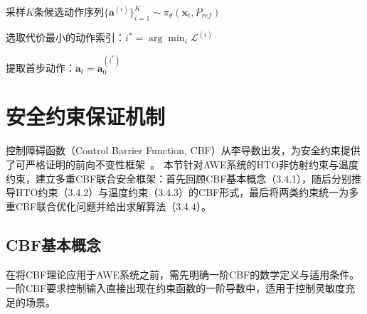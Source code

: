 \begin{algorithm}[htb]
  \caption{生成模型控制策略}
  \label{algo:generative_control}
  \SetAlgoLined

  采样$K$条候选动作序列$\{\mathbf{a}^{(i)}\}_{i=1}^K \sim \pi_\theta(\mathbf{x}_t, P_{ref})$


  选取代价最小的动作索引：$i^* = \arg\min_i \mathcal{L}^{(i)}$

  提取首步动作：$\mathbf{a}_t = \mathbf{a}^{(i^*)}_0$

\end{algorithm}

\section{安全约束保证机制}

控制障碍函数（Control Barrier Function, CBF）从李导数出发，为安全约束提供了可严格证明的前向不变性框架~\cite{Ames2019CBF}。
本节针对AWE系统的HTO非仿射约束与温度约束，建立多重CBF联合安全框架：首先回顾CBF基本概念（3.4.1），随后分别推导HTO约束（3.4.2）与温度约束（3.4.3）的CBF形式，最后将两类约束统一为多重CBF联合优化问题并给出求解算法（3.4.4）。

\subsection{CBF基本概念}

在将CBF理论应用于AWE系统之前，需先明确一阶CBF的数学定义与适用条件。一阶CBF要求控制输入直接出现在约束函数的一阶导数中，适用于控制灵敏度充足的场景。

